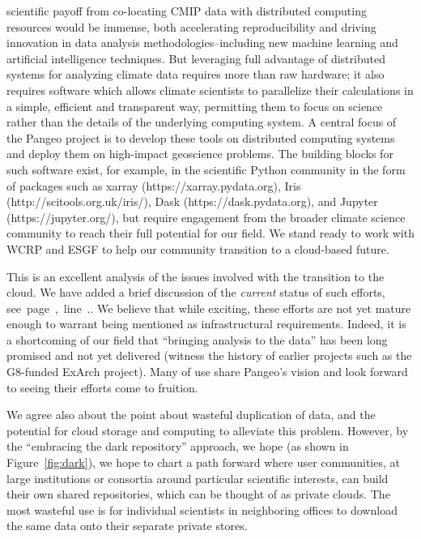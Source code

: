 \documentclass[gmd,manuscript]{copernicus}
\newcommand{\plref}[1]{\mbox{see page \pageref{p-#1}, line
    \lineref{l-#1}.}}
\newenvironment{answer}{\color{blue}}{}
\begin{document}
\begin{enumerate}[label=SC1-\arabic*,leftmargin=*]
  scientific payoff from co-locating CMIP data with distributed
  computing resources would be immense, both accelerating
  reproducibility and driving innovation in data analysis
  methodologies--including new machine learning and artificial
  intelligence techniques. But leveraging full advantage of
  distributed systems for analyzing climate data requires more than
  raw hardware; it also requires software which allows climate
  scientists to parallelize their calculations in a simple, efficient
  and transparent way, permitting them to focus on science rather than
  the details of the underlying computing system. A central focus of
  the Pangeo project is to develop these tools on distributed
  computing systems and deploy them on high-impact geoscience
  problems. The building blocks for such software exist, for example,
  in the scientific Python community in the form of packages such as
  xarray (https://xarray.pydata.org), Iris
  (http://scitools.org.uk/iris/), Dask (https://dask.pydata.org), and
  Jupyter (https://jupyter.org/), but require engagement from the
  broader climate science community to reach their full potential for
  our field. We stand ready to work with WCRP and ESGF to help our
  community transition to a cloud-based future.
\end{enumerate}

\begin{answer}
  This is an excellent analysis of the issues involved with the
  transition to the cloud. We have added a brief discussion of the
  \emph{current} status of such efforts, \plref{SC1-1}. We believe
  that while exciting, these efforts are not yet mature enough to
  warrant being mentioned as infrastructural requirements. Indeed, it
  is a shortcoming of our field that ``bringing analysis to the data''
  has been long promised and not yet delivered (witness the history of
  earlier projects such as the G8-funded ExArch project). Many
  of use share Pangeo's vision and look forward to seeing their
  efforts come to fruition.

  We agree also about the point about wasteful duplication of data,
  and the potential for cloud storage and computing to alleviate this
  problem. However, by the ``embracing the dark repository'' approach,
  we hope (as shown in Figure~\ref{fig:dark}), we hope to chart a path
  forward where user communities, at large institutions or consortia
  around particular scientific interests, can build their own shared
  repositories, which can be thought of as private clouds. The most
  wasteful use is for individual scientists in neighboring offices to
  download the same data onto their separate private stores.
\end{answer}
\end{document}
